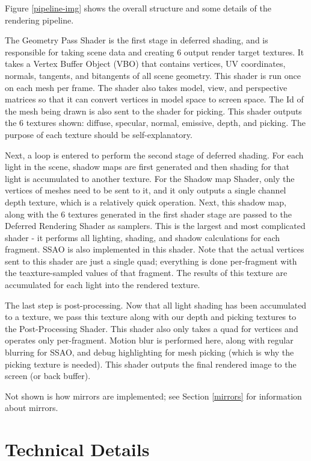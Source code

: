 \documentclass{book}
\begin{document}
      Figure \ref{pipeline-img} shows the overall structure and some details of the rendering pipeline.

      The Geometry Pass Shader is the first stage in deferred shading, and is responsible for taking scene data and creating 6 output render target textures. It takes a Vertex Buffer Object (VBO) that contains vertices, UV coordinates, normals, tangents, and bitangents of all scene geometry. This shader is run once on each mesh per frame. The shader also takes model, view, and perspective matrices so that it can convert vertices in model space to screen space. The Id of the mesh being drawn is also sent to the shader for picking. This shader outputs the 6 textures shown: diffuse, specular, normal, emissive, depth, and picking. The purpose of each texture should be self-explanatory.

      Next, a loop is entered to perform the second stage of deferred shading. For each light in the scene, shadow maps are first generated and then shading for that light is accumulated to another texture. For the Shadow map Shader, only the vertices of meshes need to be sent to it, and it only outputs a single channel depth texture, which is a relatively quick operation. Next, this shadow map, along with the 6 textures generated in the first shader stage are passed to the Deferred Rendering Shader as samplers. This is the largest and most complicated shader - it performs all lighting, shading, and shadow calculations for each fragment. SSAO is also implemented in this shader. Note that the actual vertices sent to this shader are just a single quad; everything is done per-fragment with the teaxture-sampled values of that fragment. The results of this texture are accumulated for each light into the rendered texture.

      The last step is post-processing. Now that all light shading has been accumulated to a texture, we pass this texture along with our depth and picking textures to the Post-Processing Shader. This shader also only takes a quad for vertices and operates only per-fragment. Motion blur is performed here, along with regular blurring for SSAO, and debug highlighting for mesh picking (which is why the picking texture is needed). This shader outputs the final rendered image to the screen (or back buffer).

      Not shown is how mirrors are implemented; see Section \ref{mirrors} for information about mirrors.


  \section{Technical Details} \label{technical-objectives}
\end{document}
